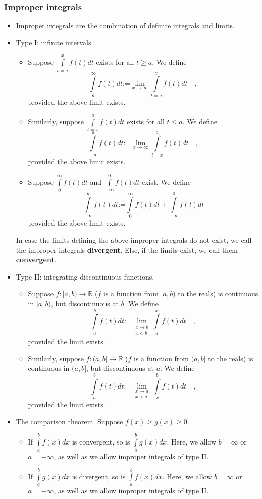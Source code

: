 \documentclass[12pt]{book}
\newcommand{\eqdef}{\textbf{:=}}
\renewcommand{\emph}{\textbf}
\begin{document}
\subsubsection{Improper integrals}\label{secImproperIntegrals}
\begin{itemize} 
\item {} Improper integrals are the combination of definite integrals and limits.
\item Type I: infinite intervals.

\begin{itemize}
\item Suppose $\int\limits_{t=a}^{x}f(t)dt$ exists for all $t\geq a$. We define 
\[
\int\limits_{a}^{\infty} f(t)dt\eqdef  \lim
\limits_{x\to \infty}\int\limits_{t=a}^{x}f(t)dt\quad,
\]
provided the above limit exists.
\item Similarly, suppose $\int\limits_{t=x}^{a}f(t)dt$ exists for all $t\leq a$. We define 
\[
\int\limits_{-\infty}^{a} f(t)dt\eqdef  \lim
\limits_{x\to \infty}\int\limits_{t=x}^{a}f(t)dt\quad,
\]
provided the above limit exists.
\item Suppose $\int\limits_{0}^{\infty}f(t)dt$ and $\int\limits_{-\infty}^{0}f(t)dt$  exist. We define
\[
\int\limits_{-\infty}^{\infty} f(t)dt\eqdef  \int\limits_{0}^{\infty}f(t)dt+\int\limits_{-\infty}^{0}f(t)dt
\]
provided the above limit exists.
\end{itemize}
In case the limits defining the above improper integrals do not exist, we call the improper integrals \emph{divergent}. Else, if the limits exist, we call them \emph{convergent}.  
\item Type II: integrating discontinuous functions.
\begin{itemize}
\item Suppose $f:[a,b)\to \mathbb R$ ($f$ is a function from $[a,b)$ to the reals) is continuous in $[a,b)$, but discontinuous at $b$. We define 
\[
\int\limits_{a}^{b}f(t)dt\eqdef \lim\limits_{\substack{x\to b \\ x<b}}\int\limits_{a}^{x} f(t)dt\quad , 
\]
provided the limit exists.
\item Similarly, suppose $f:(a,b]\to \mathbb R$ ($f$ is a function from $(a,b]$ to the reals) is continuous in $(a,b]$, but discontinuous at $a$. We define 
\[
\int\limits_{a}^{b}f(t)dt\eqdef \lim\limits_{\substack{x\to a \\ x>a}}\int\limits_{x}^{b} f(t)dt\quad , 
\]
provided the limit exists.
\end{itemize}
\item The comparison theorem. Suppose $f(x)\geq g(x)\geq 0$.
\begin{itemize}
\item If $\int\limits_{a}^{b}f(x)dx$ is convergent, so is $\int\limits_{a}^{b}g(x)dx$. Here, we allow $ b=\infty$ or $a=-\infty$, as well as we allow improper integrals of type II.
\item If $\int\limits_{a}^{b}g(x)dx$ is divergent, so is $\int\limits_{a}^{b}f(x)dx$. Here, we allow $ b=\infty$ or $a=-\infty$, as well as we allow improper integrals of type II.
\end{itemize}
\end{itemize}
\end{document}
